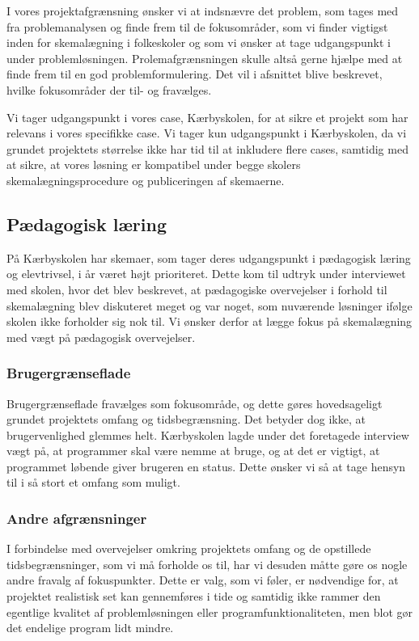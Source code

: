 \label{afg}
I vores projektafgrænsning ønsker vi at indsnævre det problem, som tages med fra problemanalysen og finde frem til de fokusområder, som vi finder vigtigst inden for skemalægning i folkeskoler og som vi ønsker at tage udgangspunkt i under problemløsningen. Prolemafgrænsningen skulle altså gerne hjælpe med at finde frem til en god problemformulering. Det vil i afsnittet blive beskrevet, hvilke fokusområder der til- og fravælges.

Vi tager udgangspunkt i vores case, Kærbyskolen, for at sikre et projekt som har relevans i vores specifikke case. Vi tager kun udgangspunkt i Kærbyskolen, da vi grundet projektets størrelse ikke har tid til at inkludere flere cases, samtidig med at sikre, at vores løsning er kompatibel under begge skolers skemalægningsprocedure og publiceringen af skemaerne. 

\subsection*{Pædagogisk læring}
På Kærbyskolen har skemaer, som tager deres udgangspunkt i pædagogisk læring og elevtrivsel, i år været højt prioriteret. Dette kom til udtryk under interviewet med skolen, hvor det blev beskrevet, at pædagogiske overvejelser i forhold til skemalægning blev diskuteret meget og var noget, som nuværende løsninger ifølge skolen ikke forholder sig nok til. Vi ønsker derfor at lægge fokus på skemalægning med vægt på pædagogisk overvejelser.

\subsubsection*{Brugergrænseflade}
Brugergrænseflade fravælges som fokusområde, og dette gøres hovedsageligt grundet projektets omfang og tidsbegrænsning. Det betyder dog ikke, at brugervenlighed glemmes helt. Kærbyskolen lagde under det foretagede interview vægt på, at programmer skal være nemme at bruge, og at det er vigtigt, at programmet løbende giver brugeren en status. Dette ønsker vi så at tage hensyn til i så stort et omfang som muligt.

\subsubsection*{Andre afgrænsninger}
I forbindelse med overvejelser omkring projektets omfang og de opstillede tidsbegrænsninger, som vi må forholde os til, har vi desuden måtte gøre os nogle andre fravalg af fokuspunkter. Dette er valg, som vi føler, er nødvendige for, at projektet realistisk set kan gennemføres i tide og samtidig ikke rammer den egentlige kvalitet af problemløsningen eller programfunktionaliteten, men blot gør det endelige program lidt mindre.

